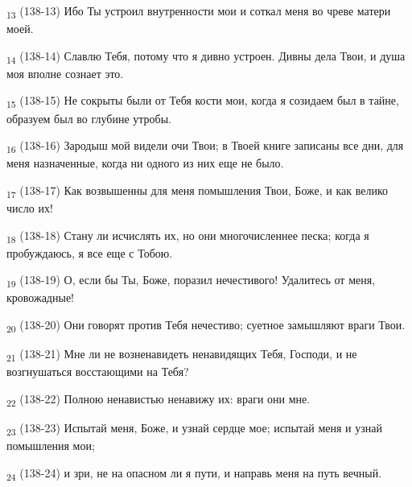 \begin{tcolorbox}
\textsubscript{13} (138-13) Ибо Ты устроил внутренности мои и соткал меня во чреве матери моей.
\end{tcolorbox}
\begin{tcolorbox}
\textsubscript{14} (138-14) Славлю Тебя, потому что я дивно устроен. Дивны дела Твои, и душа моя вполне сознает это.
\end{tcolorbox}
\begin{tcolorbox}
\textsubscript{15} (138-15) Не сокрыты были от Тебя кости мои, когда я созидаем был в тайне, образуем был во глубине утробы.
\end{tcolorbox}
\begin{tcolorbox}
\textsubscript{16} (138-16) Зародыш мой видели очи Твои; в Твоей книге записаны все дни, для меня назначенные, когда ни одного из них еще не было.
\end{tcolorbox}
\begin{tcolorbox}
\textsubscript{17} (138-17) Как возвышенны для меня помышления Твои, Боже, и как велико число их!
\end{tcolorbox}
\begin{tcolorbox}
\textsubscript{18} (138-18) Стану ли исчислять их, но они многочисленнее песка; когда я пробуждаюсь, я все еще с Тобою.
\end{tcolorbox}
\begin{tcolorbox}
\textsubscript{19} (138-19) О, если бы Ты, Боже, поразил нечестивого! Удалитесь от меня, кровожадные!
\end{tcolorbox}
\begin{tcolorbox}
\textsubscript{20} (138-20) Они говорят против Тебя нечестиво; суетное замышляют враги Твои.
\end{tcolorbox}
\begin{tcolorbox}
\textsubscript{21} (138-21) Мне ли не возненавидеть ненавидящих Тебя, Господи, и не возгнушаться восстающими на Тебя?
\end{tcolorbox}
\begin{tcolorbox}
\textsubscript{22} (138-22) Полною ненавистью ненавижу их: враги они мне.
\end{tcolorbox}
\begin{tcolorbox}
\textsubscript{23} (138-23) Испытай меня, Боже, и узнай сердце мое; испытай меня и узнай помышления мои;
\end{tcolorbox}
\begin{tcolorbox}
\textsubscript{24} (138-24) и зри, не на опасном ли я пути, и направь меня на путь вечный.
\end{tcolorbox}

